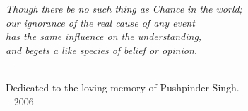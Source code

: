 \thispagestyle{empty}
{}

\vspace*{3cm}

%

%
%
%
%

\begin{center}
\emph{Though there be no such thing as Chance in the world;} \\
\emph{our ignorance of the real cause of any event} \\
\emph{has the same influence on the understanding,} \\
\emph{and begets a like species of belief or opinion.} \\ \medskip
    --- \cite{hume:1748}
\end{center}

\medskip

\begin{center}
    Dedicated to the loving memory of Pushpinder Singh. \\ \,--\,2006
\end{center}
